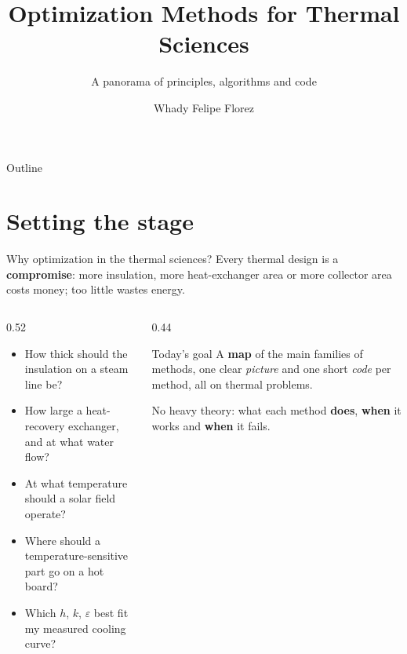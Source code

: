 \documentclass[aspectratio=169,10pt]{beamer}
\title{Optimization Methods for Thermal Sciences}
\subtitle{A panorama of principles, algorithms and code}
\author{Whady Felipe Florez}
\institute{[Seminar / institution]}
\date{}
\begin{document}
\maketitle

\begin{frame}{Outline}
  \tableofcontents
\end{frame}

\section{Setting the stage}

\begin{frame}{Why optimization in the thermal sciences?}
  Every thermal design is a \textbf{compromise}: more insulation, more heat-exchanger area or more collector area costs money; too little wastes energy.
  \vspace{0.2cm}
  \begin{columns}[T]
    \begin{column}{0.52\textwidth}
      \begin{itemize}
        \item How thick should the insulation on a steam line be?
        \item How large a heat-recovery exchanger, and at what water flow?
        \item At what temperature should a solar field operate?
        \item Where should a temperature-sensitive part go on a hot board?
        \item Which $h$, $k$, $\varepsilon$ best fit my measured cooling curve?
      \end{itemize}
    \end{column}
    \begin{column}{0.44\textwidth}
      \begin{alertblock}{Today's goal}
        A \textbf{map} of the main families of methods, one clear \emph{picture} and one short \emph{code} per method, all on thermal problems.
      \end{alertblock}
      \small No heavy theory: what each method \textbf{does}, \textbf{when} it works and \textbf{when} it fails.
    \end{column}
  \end{columns}
\end{frame}
\end{document}
